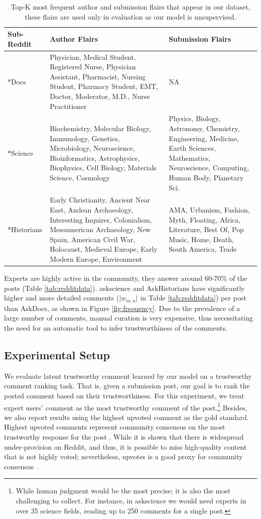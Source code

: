 \begin{table}[t]
  \centering
\begin{tabular}{ l | p{6cm} | p{6cm}}
\toprule
  Sub-Reddit & Author Flairs & Submission Flairs\\
  \midrule
 *Docs & Physician, Medical Student, Registered Nurse, Physician Assistant, Pharmacist, Nursing Student, Pharmacy Student, EMT, Doctor, Moderator, M.D., Nurse Practitioner     & NA  \\
\hline
 *Science & Biochemistry, Molecular Biology, Immunology, Genetics, Microbiology, Neuroscience, Bioinformatics, Astrophysics, Biophysics, Cell Biology, Materials Science, Cosmology & Physics, Biology, Astronomy, Chemistry, Engineering, Medicine, Earth Sciences, Mathematics, Neuroscience, Computing, Human Body, Planetary Sci. \\
\hline
*Historians & Early Christianity, Ancient Near East, Andean Archaeology, Interesting Inquirer, Colonialism, Mesoamerican Archaeology, New Spain, American Civil War, Holocaust, Medieval Europe, Early Modern Europe, Environment & AMA, Urbanism, Fashion, Myth, Floating, Africa, Literature, Best Of, Pop Music, Home, Death, South America, Trade \\
 \bottomrule
\end{tabular}
\caption{ Top-K most frequent author and submission flairs that appear in our dataset, these flairs are used only in evaluation as our model is unsupervised.  }
\label{tab:redditFlairText}
\end{table}

Experts are highly active in the community, they answer around 60-70\% of the posts (Table \ref{tab:redditdata}). askscience and AskHistorians have significantly higher and more detailed comments ($\vert w_{m, n} \vert$ in Table \ref{tab:redditdata}) per post than AskDocs, as shown in Figure \ref{fig:frequency}. Due to the prevalence of a large number of comments, manual curation is very expensive, thus necessitating the need for an automatic tool to infer trustworthiness of the comments.

\subsection{Experimental Setup}
We evaluate latent trustworthy comment learned by our model on a trustworthy comment ranking task. That is, given a submission post, our goal is to rank the posted comment based on their trustworthiness.
For this experiment, we treat expert users' comment as the most trustworthy comment of the post.\footnote{While human judgment would be the most precise; it is also the most challenging to collect. For instance, in askscience we would need experts in over 35 science fields, reading up to 250 comments for a single post.}
Besides, we also report results using the highest upvoted comment as the gold standard. Highest upvoted comments represent community consensus on the most trustworthy response for the post \cite{Voting:2019}. While it is shown that there is widespread under-provision on Reddit, and thus, it is possible to miss high-quality content that is not highly voted; nevertheless, upvotes is a good proxy for community consensus~\cite{gilbert2013widespread}.

